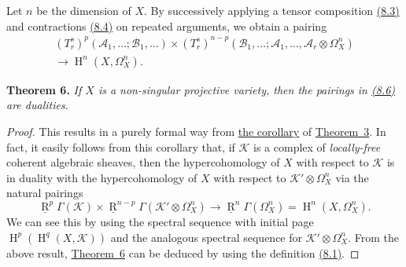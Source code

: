\documentclass{article}
\newenvironment{itenv}[1]
  {\phantomsection\par\medskip\noindent\textbf{#1.}\itshape}
  {\medskip}
\newcommand{\scr}[1]{{\mathscr{#1}}}
\DeclareMathOperator{\RR}{R}
\DeclareMathOperator{\HH}{H}
\begin{document}
Let $n$ be the dimension of $X$.
By successively applying a tensor composition \hyperref[8.3]{(8.3)} and contractions \hyperref[8.4]{(8.4)} on repeated arguments, we obtain a pairing
\[
\label{8.6}
  \begin{gathered}
    (T_r^s)^p(\scr{A}_1,\ldots;\scr{B}_1,\ldots)
    \times (T_r^s)^{n-p}(\scr{B}_1,\ldots;\scr{A}_1,\ldots,\scr{A}_r\otimes\Omega_X^n)
  \\\longrightarrow\HH^n(X,\Omega_X^n).
  \end{gathered}
\tag{8.6}
\]

\begin{itenv}{Theorem 6}
\label{theorem6}
  If $X$ is a non-singular projective variety, then the pairings in \hyperref[8.6]{(8.6)} are dualities.
\end{itenv}

\begin{proof}
  This results in a purely formal way from \hyperref[theorem3corollary]{the corollary} of \hyperref[theorem3]{Theorem~3}.
  In fact, it easily follows from this corollary that, if $\scr{K}$ is a complex of \emph{locally-free} coherent algebraic sheaves, then the hypercohomology of $X$ with respect to $\scr{K}$ is in duality with the hypercohomology of $X$ with respect to $\scr{K}'\otimes\Omega_X^n$ via the natural pairings
  \[
  \label{8.7}
    \underline{\RR}^p\Gamma(\scr{K})
    \times \underline{\RR}^{n-p}\Gamma(\scr{K}'\otimes\Omega_X^n)
    \to \underline{\RR}^n\Gamma(\Omega_X^n)
    = \HH^n(X,\Omega_X^n).
  \tag{8.7}
  \]
  We can see this by using the spectral sequence with initial page $\HH^p(\HH^q(X,\scr{K}))$ and the analogous spectral sequence for $\scr{K}'\otimes\Omega_X^n$.
  From the above result, \hyperref[theorem6]{Theorem~6} can be deduced by using the definition \hyperref[8.1]{(8.1)}.
\end{proof}
\end{document}
